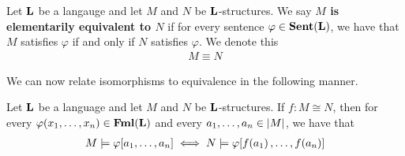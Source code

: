 \begin{boxdefinition}
    Let $\mathbf{L}$ be a langauge and let $M$ and $N$ be $\mathbf{L}$-structures. We say \textbf{$M$ is elementarily equivalent to $N$} if for every sentence $\varphi \in \mathbf{Sent}\!\left( \mathbf{L} \right)$, we have that $M$ satisfies $\varphi$ if and only if $N$ satisfies $\varphi$. We denote this
    \begin{align*}
        M \equiv N
    \end{align*}
\end{boxdefinition}

We can now relate isomorphisms to equivalence in the following manner.

\begin{boxtheorem}
    Let $\mathbf{L}$ be a language and let $M$ and $N$ be $\mathbf{L}$-structures. If $f:M \cong N$, then for every $\varphi\!\left( x_1, \ldots, x_n \right) \in \mathbf{Fml}\!\left( \mathbf{L} \right)$ and every $a_1, \ldots, a_n \in \left\lvert M \right\rvert$, we have that
    \begin{align*}
        M \models \varphi\!\left[ a_1, \ldots, a_n \right]
        \iff 
        N \models \varphi\!\left[ f\!\left( a_1 \right), \ldots, f\!\left( a_n \right) \right]
    \end{align*}
\end{boxtheorem}
